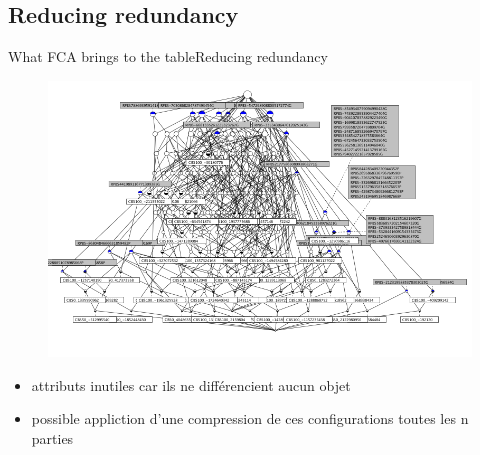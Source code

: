 \subsection{Reducing redundancy}
\begin{frame}{What FCA brings to the table}{Reducing redundancy}


\begin{minipage}[t]{0.40\linewidth}
  \begin{figure}[ht]
    \centering
    \includegraphics[width=\textwidth]{img/fca/lattice1}
  \end{figure}
\end{minipage}
\begin{minipage}{0.60\linewidth}
  \begin{itemize}
    \item attributs inutiles car ils ne différencient aucun objet
    \item possible appliction d'une compression de ces configurations
      toutes les n parties
  \end{itemize}
\end{minipage}

\end{frame}

%
